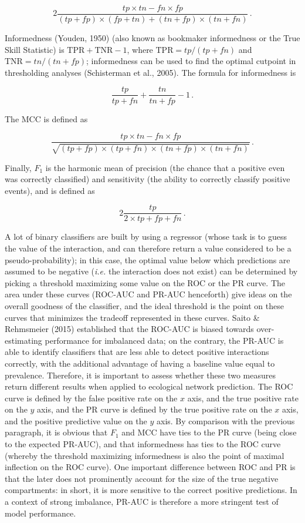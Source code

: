 \documentclass[10pt,oneside]{article}
\begin{document}
\[
2\frac{tp\times tn - fn\times fp}{(tp+fp)\times (fp+tn)+(tn+fp)\times (tn+fn)} \,.
\]

Informedness (Youden, 1950) (also known as bookmaker informedness or the
True Skill Statistic) is \(\text{TPR}+\text{TNR}-1\), where
\(\text{TPR}= tp/(tp+fn)\) and \(\text{TNR} = tn/(tn+fp)\); informedness
can be used to find the optimal cutpoint in thresholding analyses
(Schisterman et al., 2005). The formula for informedness is

\[\frac{tp}{tp+fn}+\frac{tn}{tn+fp}-1\,.\]

The MCC is defined as

\[
\frac{tp\times tn - fn\times fp}{\sqrt{(tp+fp)\times (tp+fn)\times (tn+fp)\times (tn+fn)}} \,.
\]

Finally, \(F_1\) is the harmonic mean of precision (the chance that a
positive even was correctly classified) and sensitivity (the ability to
correctly classify positive events), and is defined as

\[
2\frac{tp}{2\times tp + fp + fn}\,.
\]

A lot of binary classifiers are built by using a regressor (whose task
is to guess the value of the interaction, and can therefore return a
value considered to be a pseudo-probability); in this case, the optimal
value below which predictions are assumed to be negative (\emph{i.e.}
the interaction does not exist) can be determined by picking a threshold
maximizing some value on the ROC or the PR curve. The area under these
curves (ROC-AUC and PR-AUC henceforth) give ideas on the overall
goodness of the classifier, and the ideal threshold is the point on
these curves that minimizes the tradeoff represented in these curves.
Saito \& Rehmsmeier (2015) established that the ROC-AUC is biased
towards over-estimating performance for imbalanced data; on the
contrary, the PR-AUC is able to identify classifiers that are less able
to detect positive interactions correctly, with the additional advantage
of having a baseline value equal to prevalence. Therefore, it is
important to assess whether these two measures return different results
when applied to ecological network prediction. The ROC curve is defined
by the false positive rate on the \(x\) axis, and the true positive rate
on the \(y\) axis, and the PR curve is defined by the true positive rate
on the \(x\) axis, and the positive predictive value on the \(y\) axis.
By comparison with the previous paragraph, it is obvious that \(F_1\)
and MCC have ties to the PR curve (being close to the expected PR-AUC),
and that informedness has ties to the ROC curve (whereby the threshold
maximizing informedness is also the point of maximal inflection on the
ROC curve). One important difference between ROC and PR is that the
later does not prominently account for the size of the true negative
compartments: in short, it is more sensitive to the correct positive
predictions. In a context of strong imbalance, PR-AUC is therefore a
more stringent test of model performance.
\end{document}
